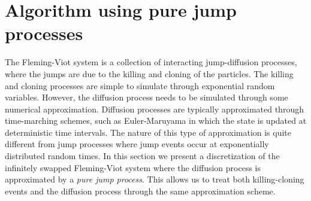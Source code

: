 \documentclass[english,11pt]{article}%
\numberwithin{equation}{section}
\numberwithin{example}{section}
\numberwithin{theorem}{section}
\begin{document}
\section{Algorithm using pure jump processes}
\label{sec:pure_jump}
 The Fleming-Viot system is a collection of interacting jump-diffusion processes, where the jumps are due to the killing and cloning of the particles. The killing and cloning processes are simple to simulate through exponential random variables.
 However, the diffusion process needs to be simulated through some numerical approximation. Diffusion processes are typically approximated through time-marching schemes, such as Euler-Maruyama in which the state is updated at deterministic time intervals. The nature of this type of approximation is quite different from jump processes where jump events occur at exponentially distributed random times. In this section we present a discretization of the infinitely swapped Fleming-Viot system where the diffusion process is approximated by a \emph{pure jump process}. This allows us to treat both killing-cloning events and the diffusion process through the same approximation scheme. 
 
\end{document}
